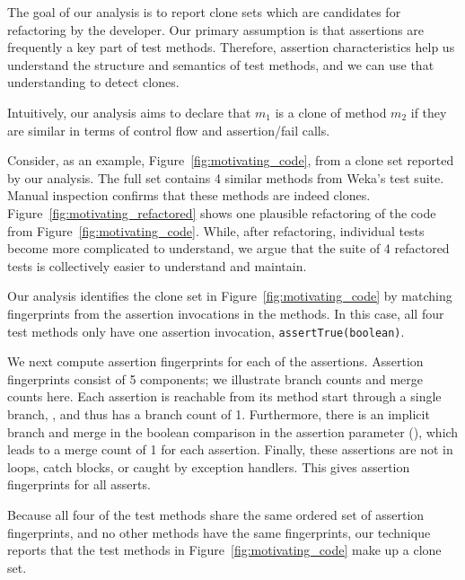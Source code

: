 The goal of our analysis is to report clone sets which are candidates
for refactoring by the developer.  
Our primary
assumption is that assertions are frequently a key part of test
methods. Therefore, assertion characteristics
help us understand the structure and
semantics of test methods, and we can use that understanding to detect clones.

Intuitively, our analysis aims to declare that $m_1$ is a clone of
method $m_2$ if they are similar in terms of control flow and
assertion/fail calls.

Consider, as an example, Figure~\ref{fig:motivating_code}, from a clone set reported by our
analysis. The full set contains 4 similar methods from Weka's test
suite.  Manual inspection confirms that these methods are
indeed clones.  Figure~\ref{fig:motivating_refactored}
shows one plausible refactoring of the code from
Figure~\ref{fig:motivating_code}. While, after refactoring, individual tests become
more complicated to understand, we argue that the suite of 4 refactored tests 
is collectively easier to understand and maintain.

Our analysis identifies the clone set in Figure~\ref{fig:motivating_code} by
matching fingerprints from the assertion invocations in the methods. 
In this case, all four test methods only have one assertion invocation, {\tt assertTrue(boolean)}. 

We next compute assertion fingerprints for each of the assertions.  
Assertion fingerprints consist of 5 components; we illustrate 
branch counts and merge counts here. Each assertion is reachable
from its method start through a single branch, , and thus has a branch count of 1. Furthermore,
there is an implicit branch and merge in the boolean comparison in the
assertion parameter (), which leads to a merge
count of 1 for each assertion. Finally, these assertions are not in loops,
catch blocks, or caught by exception handlers. This gives assertion
fingerprints  for all asserts.

Because all four of the test methods share the same ordered set of
assertion fingerprints, and no other methods have the same
fingerprints, our technique reports that the test methods in
Figure~\ref{fig:motivating_code} make up a clone set.

\thesis{

}
\paper{

}




